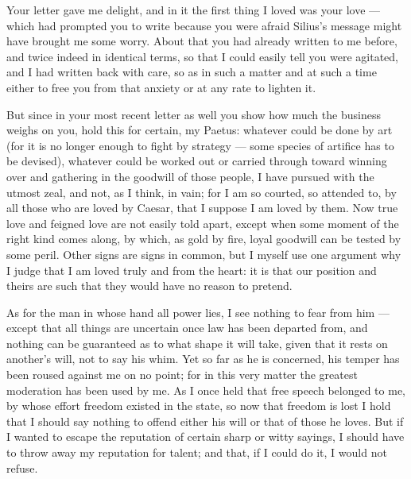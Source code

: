 

 Your letter gave me delight, and in it the first thing I loved was your love --- which had prompted you to write because you were afraid Silius's message might have brought me some worry. About that you had already written to me before, and twice indeed in identical terms, so that I could easily tell you were agitated, and I had written back with care, so as in such a matter and at such a time either to free you from that anxiety or at any rate to lighten it.

 But since in your most recent letter as well you show how much the business weighs on you, hold this for certain, my Paetus: whatever could be done by art (for it is no longer enough to fight by strategy --- some species of artifice has to be devised), whatever could be worked out or carried through toward winning over and gathering in the goodwill of those people, I have pursued with the utmost zeal, and not, as I think, in vain; for I am so courted, so attended to, by all those who are loved by Caesar, that I suppose I am loved by them. Now true love and feigned love are not easily told apart, except when some moment of the right kind comes along, by which, as gold by fire, loyal goodwill can be tested by some peril. Other signs are signs in common, but I myself use one argument why I judge that I am loved truly and from the heart: it is that our position and theirs are such that they would have no reason to pretend.

 As for the man in whose hand all power lies, I see nothing to fear from him --- except that all things are uncertain once law has been departed from, and nothing can be guaranteed as to what shape it will take, given that it rests on another's will, not to say his whim. Yet so far as he is concerned, his temper has been roused against me on no point; for in this very matter the greatest moderation has been used by me. As I once held that free speech belonged to me, by whose effort freedom existed in the state, so now that freedom is lost I hold that I should say nothing to offend either his will or that of those he loves. But if I wanted to escape the reputation of certain sharp or witty sayings, I should have to throw away my reputation for talent; and that, if I could do it, I would not refuse.

